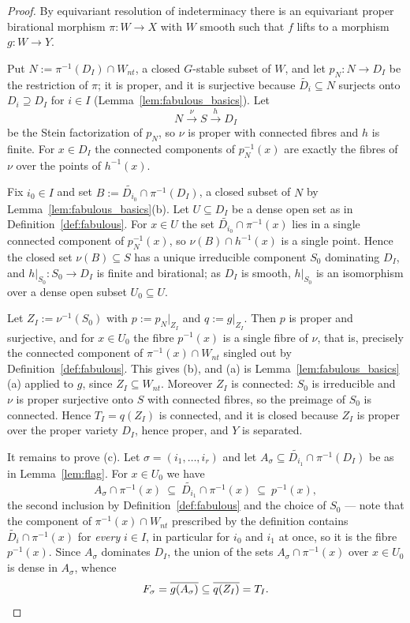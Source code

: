 \documentclass[11pt]{amsart}
\theoremstyle{plain}
\theoremstyle{definition}
\theoremstyle{remark}
\numberwithin{equation}{section}
\begin{document}
\begin{proof}
By equivariant resolution of indeterminacy
\cite{ReichsteinYoussinIndeterminacy} there is an equivariant proper
birational morphism $\pi : W \to X$ with $W$ smooth such that $f$ lifts to
a morphism $g : W \to Y$.

Put $N := \pi^{-1}(D_I) \cap W_{nt}$, a closed $G$-stable subset of $W$,
and let $p_N : N \to D_I$ be the restriction of $\pi$; it is proper, and it
is surjective because $\widetilde{D_i} \subseteq N$ surjects onto $D_i
\supseteq D_I$ for $i \in I$ (Lemma~\ref{lem:fabulous_basics}).  Let
\[
N \xrightarrow{\ \nu\ } S \xrightarrow{\ h\ } D_I
\]
be the Stein factorization of $p_N$, so $\nu$ is proper with connected
fibres and $h$ is finite.  For $x \in D_I$ the connected components of
$p_N^{-1}(x)$ are exactly the fibres of $\nu$ over the points of
$h^{-1}(x)$.

Fix $i_0 \in I$ and set $B := \widetilde{D_{i_0}} \cap \pi^{-1}(D_I)$,
a closed subset of $N$ by Lemma~\ref{lem:fabulous_basics}(b).  Let
$U \subseteq D_I$ be a dense open set as in
Definition~\ref{def:fabulous}.  For $x \in U$ the set $\widetilde{D_{i_0}}
\cap \pi^{-1}(x)$ lies in a single connected component of $p_N^{-1}(x)$,
so $\nu(B) \cap h^{-1}(x)$ is a single point.  Hence the closed set
$\nu(B) \subseteq S$ has a unique irreducible component $S_0$ dominating
$D_I$, and $h|_{S_0} : S_0 \to D_I$ is finite and birational; as $D_I$ is
smooth, $h|_{S_0}$ is an isomorphism over a dense open subset $U_0
\subseteq U$.

Let $Z_I := \nu^{-1}(S_0)$ with $p := p_N|_{Z_I}$ and $q := g|_{Z_I}$.
Then $p$ is proper and surjective, and for $x \in U_0$ the fibre
$p^{-1}(x)$ is a single fibre of $\nu$, that is, precisely the connected
component of $\pi^{-1}(x) \cap W_{nt}$ singled out by
Definition~\ref{def:fabulous}.  This gives (b), and (a) is
Lemma~\ref{lem:fabulous_basics}(a) applied to $g$, since $Z_I \subseteq
W_{nt}$.  Moreover $Z_I$ is connected: $S_0$ is irreducible and $\nu$ is
proper surjective onto $S$ with connected fibres, so the preimage of $S_0$
is connected.  Hence $T_I = q(Z_I)$ is connected, and it is closed because
$Z_I$ is proper over the proper variety $D_I$, hence proper, and $Y$ is
separated.

It remains to prove (c).  Let $\sigma = (i_1,\ldots,i_r)$ and let
$A_\sigma \subseteq \widetilde{D_{i_1}} \cap \pi^{-1}(D_I)$ be as in
Lemma~\ref{lem:flag}.  For $x \in U_0$ we have
\[
A_\sigma \cap \pi^{-1}(x)
\ \subseteq\ \widetilde{D_{i_1}} \cap \pi^{-1}(x)
\ \subseteq\ p^{-1}(x) ,
\]
the second inclusion by Definition~\ref{def:fabulous} and the choice of
$S_0$ --- note that the component of $\pi^{-1}(x) \cap W_{nt}$ prescribed
by the definition contains $\widetilde{D_i} \cap \pi^{-1}(x)$ for
\emph{every} $i \in I$, in particular for $i_0$ and $i_1$ at once, so it is
the fibre $p^{-1}(x)$.  Since $A_\sigma$ dominates $D_I$, the union of the
sets $A_\sigma \cap \pi^{-1}(x)$ over $x \in U_0$ is dense in $A_\sigma$,
whence
\[
F_\sigma = \overline{g(A_\sigma)} \subseteq \overline{q(Z_I)} = T_I . \qedhere
\]
\end{proof}
\end{document}
